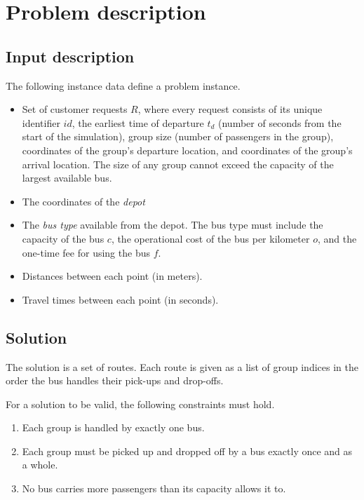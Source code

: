 \chapter{Problem description}

\section{Input description}

The following instance data define a problem instance.

\begin{itemize}
    \item Set of customer requests $R$, where every request consists of its unique identifier $id$, the earliest time of departure $t_d$ (number of seconds from the start of the simulation), group size (number of passengers in the group), coordinates of the group's departure location, and coordinates of the group's arrival location. The size of any group cannot exceed the capacity of the largest available bus.
    \item The coordinates of the \textit{depot}
    \item The \textit{bus type} available from the depot. The bus type must include the capacity of the bus $c$, the operational cost of the bus per kilometer $o$, and the one-time fee for using the bus $f$.
    \item Distances between each point (in meters).
    \item Travel times between each point (in seconds).
\end{itemize}

\section{Solution} \label{sec:solution}

The solution is a set of routes. Each route is given as a list of group indices in the order the bus handles their pick-ups and drop-offs.

For a solution to be valid, the following constraints must hold.

\begin{enumerate}[(1)]\label{constraints}
    \setlength\itemsep{0pt}
    \item Each group is handled by exactly one bus.
    \item Each group must be picked up and dropped off by a bus exactly once and as a whole.
    \item No bus carries more passengers than its capacity allows it to.
\end{enumerate}

